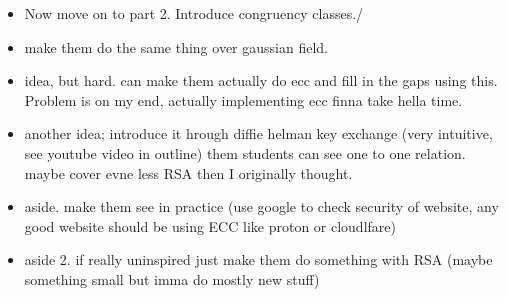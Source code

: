 \documentclass{article}
\begin{document}
\begin{itemize}
    \item Now move on to part 2. Introduce congruency classes./
    \item make them do the same thing over gaussian field.

    \item idea, but hard. can make them actually do ecc and fill in the gaps using this. Problem is on my end, actually implementing ecc finna take hella time.
    \item another idea; introduce it hrough diffie helman key exchange (very intuitive, see youtube video in outline) them students can see one to one relation. maybe cover evne less RSA then I originally thought.

    \item aside. make them see in practice (use google to check security of website, any good website should be using ECC like proton or cloudlfare)
    \item aside 2. if really uninspired just make them do something with RSA (maybe something small but imma do mostly new stuff)
\end{itemize}

    
\end{document}
